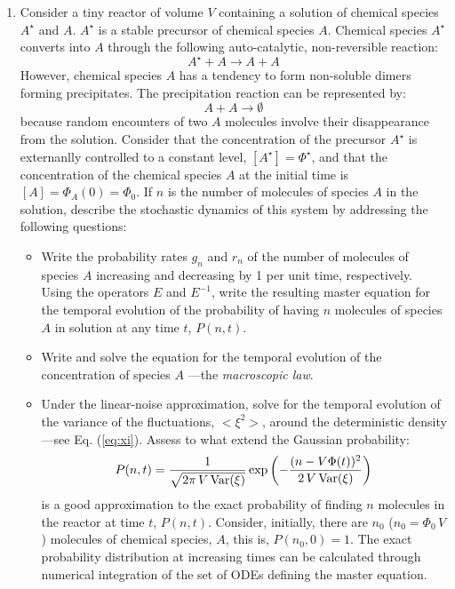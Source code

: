 \begin{enumerate}
\item Consider a tiny reactor of volume $V$ containing a solution of chemical species $A^{\star}$ and $A$. $A^{\star}$ is a stable precursor of chemical species $A$. Chemical species $A^{\star}$ converts into $A$ through the following auto-catalytic, non-reversible reaction:
\begin{equation}
A^{\star} + A \longrightarrow A + A
\end{equation}    
However, chemical species $A$ has a tendency to form non-soluble dimers forming precipitates. The precipitation reaction can be represented by:   
\begin{equation}
A + A \longrightarrow \emptyset
\end{equation}
because random encounters of two $A$ molecules involve their disappearance from the solution. Consider that the concentration of the precursor $A^{\star}$ is externanlly controlled to a constant level, $[A^{\star}] = \Phi^{\star}$, and that the concentration of the chemical species $A$ at the initial time is $[A]= \Phi_A(0) = \Phi_0$. If $n$ is the number of molecules of species $A$ in the solution, describe the stochastic dynamics of this system by addressing the following questions:
\begin{itemize}
\item Write the probability rates $g_n$ and $r_n$ of the number of molecules of species $A$ increasing and decreasing by 1 per unit time,  respectively. Using the operators $E$ and $E^{-1}$, write the resulting master equation for the temporal evolution of the probability of having $n$ molecules of species $A$ in solution at any time $t$, $P(n,t)$. 
\item Write and solve the equation for the temporal evolution of the concentration of species $A$ ---the {\em macroscopic law}.    
\item Under the linear-noise approximation, solve for the temporal evolution of the variance of the fluctuations,  $<\xi^2>$, around the deterministic density ---see Eq. (\ref{eq:xi}). Assess to what extend the Gaussian probability:
\begin{equation}
  P(n,t) = \frac{1}{\sqrt{2\pi\,V\,\textup{Var}(\xi)}}\exp\left(-\frac{(n-V\Phi(t))^2}{2\,V\,\textup{Var}(\xi)}\right)
\end{equation} 
is a good approximation to the exact probability of finding $n$ molecules in the reactor at time $t$, $P(n,t)$. Consider, initially, there are $n_0$ ($n_0 = \Phi_0\,V$) molecules of chemical species, $A$, this is, $P(n_0, 0) = 1$. The exact probability distribution at increasing times can be calculated through numerical integration of the set of ODEs defining the master equation. 
\end{itemize}
\end{enumerate}

